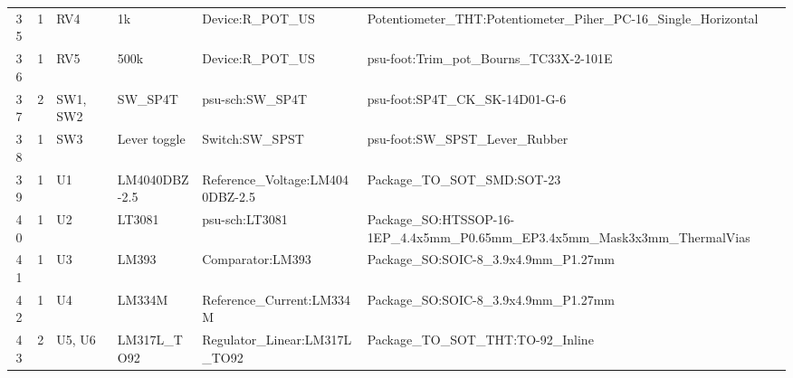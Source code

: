 \documentclass[letterpaper,twocolumn,10pt]{article}
\begin{document}
\begin{sidewaystable*}[ht]
{\begin{tabular}{cclllll}
      35                     & 1                                                        & RV4                    & 1k                     & Device:R\_POT\_US                & Potentiometer\_THT:Potentiometer\_Piher\_PC-16\_Single\_Horizontal                                      \\
      36                     & 1                                                        & RV5                    & 500k                   & Device:R\_POT\_US                & psu-foot:Trim\_pot\_Bourns\_TC33X-2-101E                                                                \\
      37                     & 2                                                        & SW1, SW2               & SW\_SP4T               & psu-sch:SW\_SP4T                 & psu-foot:SP4T\_CK\_SK-14D01-G-6                                                                         \\
      38                     & 1                                                        & SW3                    & Lever toggle           & Switch:SW\_SPST                  & psu-foot:SW\_SPST\_Lever\_Rubber                                                                        \\
      39                     & 1                                                        & U1                     & LM4040DBZ-2.5          & Reference\_Voltage:LM4040DBZ-2.5 & Package\_TO\_SOT\_SMD:SOT-23                                                                            \\
      40                     & 1                                                        & U2                     & LT3081                 & psu-sch:LT3081                   & Package\_SO:HTSSOP-16-1EP\_4.4x5mm\_P0.65mm\_EP3.4x5mm\_Mask3x3mm\_ThermalVias                          \\
      41                     & 1                                                        & U3                     & LM393                  & Comparator:LM393                 & Package\_SO:SOIC-8\_3.9x4.9mm\_P1.27mm                                                                  \\
      42                     & 1                                                        & U4                     & LM334M                 & Reference\_Current:LM334M        & Package\_SO:SOIC-8\_3.9x4.9mm\_P1.27mm                                                                  \\
      43                     & 2
      & U5, U6                 & LM317L\_TO92           &
      Regulator\_Linear:LM317L\_TO92   & Package\_TO\_SOT\_THT:TO-92\_Inline
      \\
      \bottomrule
  \end{tabular}}
\end{sidewaystable*}
\clearpage
\end{document}
